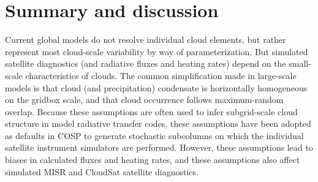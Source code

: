 \section{Summary and discussion}\label{sec:subgrid1Summary}

Current global models do not resolve individual cloud elements, but
rather represent most cloud-scale variability by way of
parameterization. But simulated satellite diagnostics (and radiative
fluxes and heating rates) depend on the small-scale characteristics of
clouds. The common simplification made in large-scale models is that
cloud (and precipitation) condensate is horizontally homogeneous on the
gridbox scale, and that cloud occurrence follows maximum-random overlap.
Because these assumptions are often used to infer subgrid-scale cloud
structure in model radiative transfer codes, these assumptions have been
adopted as defaults in COSP to generate stochastic subcolumns on which
the individual satellite instrument simulators are performed. However,
these assumptions lead to biases in calculated fluxes and heating rates,
and these assumptions also affect simulated MISR and CloudSat satellite
diagnostics.

